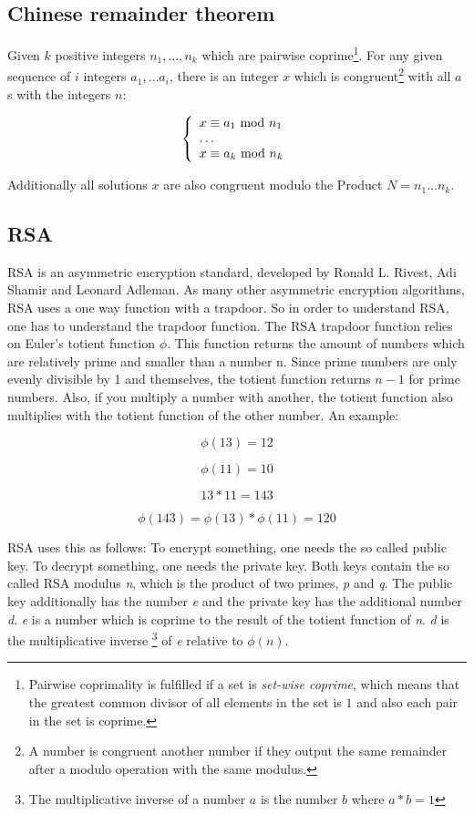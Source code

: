 \subsection{Chinese remainder theorem}

Given $k$ positive integers $n_1, \ldots, n_k$ which are pairwise coprime\footnote{
  Pairwise coprimality is fulfilled if a set is \textit{set-wise coprime},
  which means that the greatest common divisor of all elements in the set
  is $1$ and also each pair in the set is coprime.
}. For any given sequence of $i$ integers  $a_1, \ldots a_i$, there is an integer
$x$ which is congruent\footnote{
  A number is congruent another number if they output the same remainder
  after a modulo operation with the same modulus.
}
with all $a$s with the integers $n$:

$$
\left\{
\begin{array}{l l l}
  x \equiv a_1 \ \text{mod}\ n_1 \\
  \ldots \\
  x \equiv a_k \ \text{mod}\ n_k
\end{array}
\right.
$$

Additionally all solutions $x$ are also congruent modulo the Product $N = n_1 \ldots n_k$.

\subsection{RSA}
\label{sub_sec:rsa}
	
RSA is an asymmetric encryption standard, developed by Ronald L. Rivest, Adi Shamir and
Leonard Adleman. As many other asymmetric encryption algorithms, RSA uses a one way function
with a trapdoor. So in order to understand RSA, one has to understand the
trapdoor function. The RSA trapdoor function relies on Euler's totient function
$\phi$. This function returns the amount of numbers which are relatively prime
and smaller than a number n. Since prime numbers are only evenly divisible by
1 and themselves, the totient function returns $n - 1$ for prime numbers. Also,
if you multiply a number with another, the totient function also multiplies
with the totient function of the other number. An example:

$$\phi(13) = 12$$

$$\phi(11) = 10$$

$$13 * 11 = 143$$

$$\phi(143) = \phi(13) * \phi(11) = 120$$

RSA uses this as follows: To encrypt something, one needs the so called
public key. To decrypt something, one needs the private key. Both keys
contain the so called RSA modulus \textit{n}, which is the product of 
two primes, \textit{p} and \textit{q}. The public key additionally has
the number \textit{e} and the private key has the additional number
\textit{d}. \textit{e} is a number which is coprime to the result of
the totient function of \textit{n}. \textit{d} is the multiplicative inverse
\footnote{The multiplicative inverse of a number $a$ is the number $b$ where $a*b = 1$} of
\textit{e} relative to $\phi(n)$.

